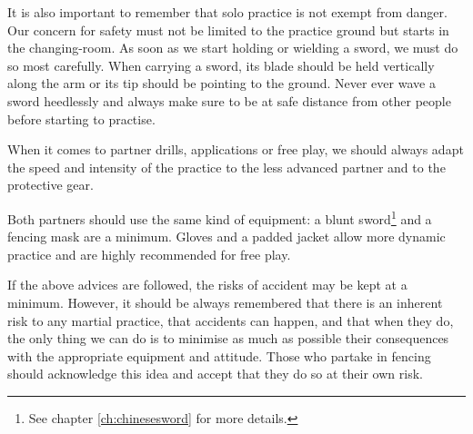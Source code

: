 It is also important to remember that solo practice is not exempt from danger. Our concern for safety must not be limited to the practice ground but starts in the changing-room. As soon as we start holding or wielding a sword,  we must do so most carefully. When carrying a sword, its blade should be held vertically along the arm or its tip should be pointing to the ground. Never ever wave a sword heedlessly and always make sure to be at safe distance from other people before starting to practise. 

When it comes to partner drills, applications or free play, we should always adapt the speed and intensity of the practice to the less advanced partner and to the protective gear. 

Both partners should use the same kind of equipment: a blunt sword\footnote{See chapter \ref*{ch:chinesesword} for more details.} and a fencing mask are a minimum. Gloves and a padded jacket allow more dynamic practice and are highly recommended for free play. 

If the above advices are followed, the risks of accident may be kept at a minimum. However, it should be always remembered that there is an inherent risk to any martial practice, that accidents can happen, and that when they do, the only thing we can do is to minimise as much as possible their consequences with the appropriate equipment and attitude. Those who partake in \Taijijian{} fencing should acknowledge this idea and accept that they do so at their own risk. 


